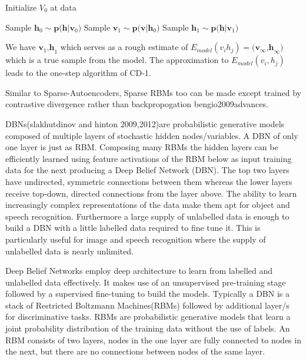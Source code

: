 Initialize $V_0$ at data

Sample $\textbf{h}_0 \sim \textbf{p(h}\vert \textbf{v}_0 ) $
Sample $\textbf{v}_1 \sim \textbf{p(v}\vert \textbf{h}_0)$
Sample $\textbf{h}_1 \sim \textbf{p(h}\vert \textbf{v}_1)$

We have $\textbf{v}_1\textbf{,h}_1$ which serves as a rough estimate of $E_{model} (v_ih_j) = (\textbf{v}_\infty\textbf{,h}_\infty\textbf{)}$ which is a true sample from the model.
The approximation to $E_{model}(v_i,h_j)$ leads to the one-step algorithm of CD-1.

Similar to Sparse-Autoencoders, Sparse RBMs too can be made except trained by contrastive divergence rather than backpropogation
{bengio2009advances}. 





DBNs(slakhutdinov and hinton 2009,2012)are probabilistic generative models composed of multiple layers of stochastic hidden nodes/variables.
A DBN of only one layer is just as RBM.
Composing many RBMs the hidden layers can be efficiently learned using feature activations of the RBM below as input training data for the next producing a Deep Belief Network (DBN)\citep{dengthree}.
The top two layers have undirected, symmetric connections between them whereas the lower layers receive top-down, directed connections from the layer above\citep{dengthree}.
The ability to learn increasingly complex representations of the data make them apt for object and speech recognition.
Furthermore a large supply  of unlabelled data is enough to build a DBN with a little labelled data required to fine tune it\citep{dengthree}.
This is particularly useful for  image and speech recognition where the supply of unlabelled data is nearly unlimited\citep{dengthree}\citep{lecun1995convolutional}.


Deep Belief Networks employ deep architecture to learn from labelled and unlabelled data effectively\citep{dengthree}.
It makes use of an unsupervised pre-training stage followed by a supervised fine-tuning to build the models\citep{chen2014big}.
Typically a DBN is a stack of Restricted Boltzmann Machines(RBMs) followed by additional layer/s for discriminative tasks\citep{dengthree}.
RBMs are probabilistic generative models that learn a joint probability distribution of the training data without the use of labels.
An RBM consists of two layers, nodes in the one layer are fully connected to nodes in the next\citep{chen2014big}, but there are no connections between nodes of the same layer.

